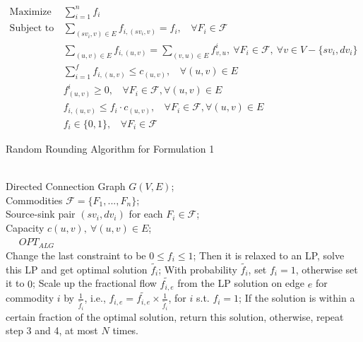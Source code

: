 \documentclass[conference]{IEEEtran}
\begin{document}
\begin{equation} \nonumber
\begin{aligned}
\text{Maximize } &\sum_{i=1}^{n}f_i \\  \nonumber
\text{Subject to } &\sum_{(sv_i,v) \in E}f_{i, (sv_i,v)} = f_i,~~~~ \forall F_i \in \mathcal{F} \\ \nonumber
&\sum_{(u, v) \in E}f_{i,(u, v)} = \sum_{(v, u) \in E}f_{v, u}^i, ~\forall F_i \in \mathcal{F}, ~ \forall v \in V - \{sv_i,dv_i\} \\  \nonumber
&\sum_{i=1}^{f}f_{i,(u, v)} \leq c_{(u, v)},~~~~ \forall (u, v) \in E \\ \nonumber
&f_{(u, v)}^i \geq 0,~~~~ \forall F_i \in \mathcal{F},  \forall (u, v) \in E \\ \nonumber
&f_{i,(u, v)} \leq f_i \cdot c_{(u, v)},~~~~ \forall F_i \in \mathcal{F},  \forall (u, v) \in E \\ \nonumber
&f_i \in \{0, 1\},~~~~ \forall F_i \in \mathcal{F} \nonumber
\end{aligned}
\end{equation}


\begin{algorithm}[t]
	\small
	\renewcommand{\algorithmicrequire}{\textbf{Input:}}
	\renewcommand\algorithmicensure {\textbf{Output:} }
	\caption{Random Rounding Algorithm for Formulation 1}
	\label{alg:randomrounding}
	\begin{algorithmic}[1] %
		\REQUIRE ~~\\ %
		Directed Connection Graph $G(V, E)$;\\
		Commodities $\mathcal{F} = \{F_1, ..., F_n\}$;\\
		Source-sink pair $(sv_i, dv_i)$ for each $ F_i \in \mathcal{F}$;\\
		Capacity $c(u, v), ~ \forall (u, v)\in E$;\\
		\ENSURE ~~ $OPT_{ALG}$\\ 
		\STATE Change the last constraint to be 
		$0 \leq f_i \leq 1$;
		\STATE Then it is relaxed to an LP, solve this LP and get optimal solution $\tilde{f_i}$;
		\STATE With probability $\tilde{f_i}$, set $f_i = 1$, otherwise set it to $0$;
		\STATE Scale up the fractional flow $\tilde{f_{i,e}}$ from the LP solution on edge $e$ for commodity $i$ by $\frac{1}{\tilde{f_i}}$, i.e., $f_{i,e} = \tilde{f_{i,e}} \times \frac{1}{\tilde{f_i}}$, for $i$ s.t. $f_i = 1$;
		\STATE If the solution is within a certain fraction of the optimal solution, return this solution, otherwise, repeat step 3 and 4, at most $N$ times.
		
	\end{algorithmic}
\end{algorithm}
\end{document}
